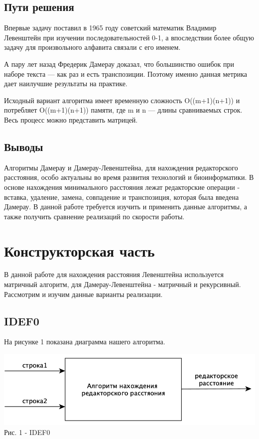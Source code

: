 \documentclass[a4paper,14pt]{article} %
\begin{document}
        \subsection{Пути решения}
        \hfill
        
        Впервые задачу поставил в 1965 году советский математик Владимир Левенштейн при изучении последовательностей 0-1, а впоследствии более общую задачу для произвольного алфавита связали с его именем. 
        
        \hfill
        
        А пару лет назад Фредерик Дамерау доказал, что большинство ошибок при наборе текста — как раз и есть транспозиции. Поэтому именно данная метрика дает наилучшие результаты на практике.
        
        \hfill
        
        Исходный вариант алгоритма имеет временную сложность O((m+1)(n+1)) и потребляет O((m+1)(n+1)) памяти, где m и n — длины сравниваемых строк. Весь процесс можно представить матрицей. 
        
           \subsection{Выводы} 
           \hfill
           
           Алгоритмы Дамерау и Дамерау-Левенштейна, для нахождения редакторского расстояния, особо актуальны во время развития технологий и биоинформатики. В основе нахождения минимального расстояния лежат редакторские операции - вставка, удаление, замена, совпадение и транспозиция, которая была введена Дамерау. В данной работе требуется изучить и применить данные алгоритмы, а также получить сравнение реализаций по скорости работы. 
	  
	\newpage

	\section{Конструкторская часть}
	\hfill
	
	В данной работе для нахождения расстояния Левенштейна используется матричный алгоритм, для Дамерау-Левенштейна - матричный и рекурсивный. Рассмотрим и изучим данные варианты реализации. 
	\subsection{IDEF0}
	\hfill
	
	На рисунке 1 показана диаграмма нашего алгоритма.  
	\begin{center}
		\includegraphics[scale = 0.5]{idef0} \\ Рис.  1 - IDEF0
	\end{center}
        
\end{document}
